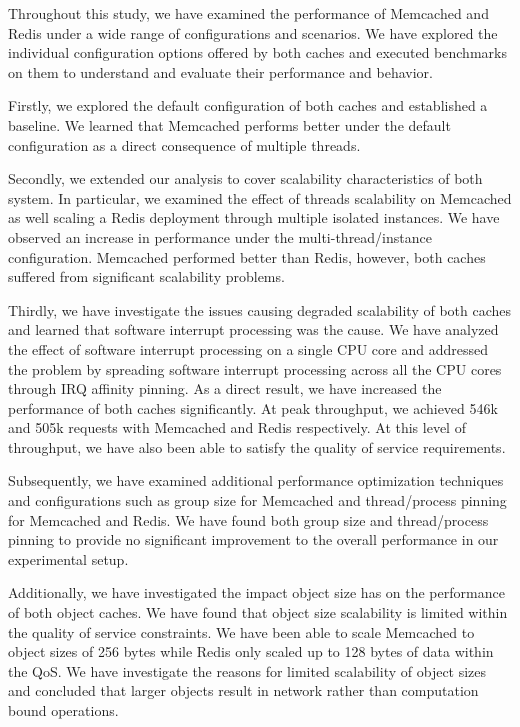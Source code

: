 Throughout this study, we have examined the performance of Memcached and Redis under a wide range of configurations and scenarios. We have explored the individual configuration options offered by both caches and executed benchmarks on them to understand and evaluate their performance and behavior.

Firstly, we explored the default configuration of both caches and established a baseline. We learned that Memcached performs better under the default configuration as a direct consequence of multiple threads.

Secondly, we extended our analysis to cover scalability characteristics of both system. In particular, we examined the effect of threads scalability on Memcached as well scaling a Redis deployment through multiple isolated instances. We have observed an increase in performance under the multi-thread/instance configuration. Memcached performed better than Redis, however, both caches suffered from significant scalability problems.

Thirdly, we have investigate the issues causing degraded scalability of both caches and learned that software interrupt processing was the cause. We have analyzed the effect of software interrupt processing on a single CPU core and addressed the problem by spreading software interrupt processing across all the CPU cores through IRQ affinity pinning. As a direct result, we have increased the performance of both caches significantly. At peak throughput, we achieved 546k and 505k requests with Memcached and Redis respectively. At this level of throughput, we have also been able to satisfy the quality of service requirements.

Subsequently, we have examined additional performance optimization techniques and configurations such as group size for Memcached and thread/process pinning for Memcached and Redis. We have found both group size and thread/process pinning to provide no significant improvement to the overall performance in our experimental setup.

Additionally, we have investigated the impact object size has on the performance of both object caches. We have found that object size scalability is limited within the quality of service constraints. We have been able to scale Memcached to object sizes of 256 bytes while Redis only scaled up to 128 bytes of data within the QoS. We have investigate the reasons for limited scalability of object sizes and concluded that larger objects result in network rather than computation bound operations.

